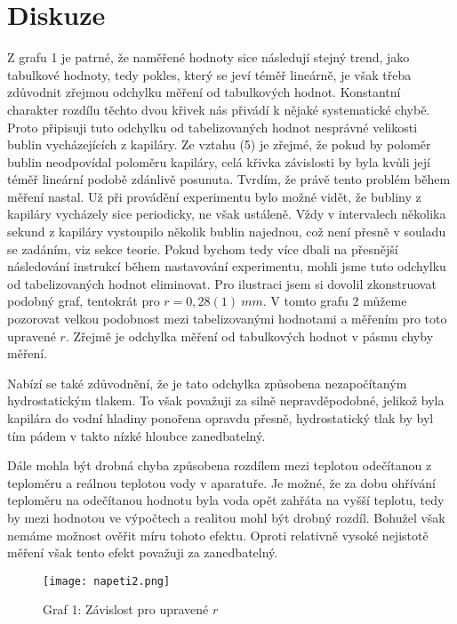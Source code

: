 \documentclass{prepareprotokol} %
\begin{document}
\section{Diskuze}

Z grafu 1 je patrné, že naměřené hodnoty sice následují stejný trend, jako tabulkové hodnoty, tedy pokles, který se jeví téměř lineárně, je však třeba zdůvodnit zřejmou odchylku měření od tabulkových hodnot. Konstantní charakter rozdílu těchto dvou křivek nás přivádí k nějaké systematické chybě. Proto připisuji tuto odchylku od tabelizovaných hodnot nesprávné velikosti bublin vycházejících z kapiláry. Ze vztahu (5) je zřejmé, že pokud by poloměr bublin neodpovídal poloměru kapiláry, celá křivka závislosti by byla kvůli její téměř lineární podobě zdánlivě posunuta. Tvrdím, že právě tento problém během měření nastal. Už při provádění experimentu bylo možné vidět, že bubliny z kapiláry vycházely sice periodicky, ne však ustáleně. Vždy v intervalech několika sekund z kapiláry vystoupilo několik bublin najednou, což není přesně v souladu se zadáním, viz sekce teorie. Pokud bychom tedy více dbali na přesnější následování instrukcí během nastavování experimentu, mohli jsme tuto odchylku od tabelizovaných hodnot eliminovat. Pro ilustraci jsem si dovolil zkonstruovat podobný graf, tentokrát pro $r=0,28(1) \:mm$. V tomto grafu 2 můžeme pozorovat velkou podobnost mezi tabelizovanými hodnotami a měřením pro toto upravené $r$. Zřejmě je odchylka měření od tabulkových hodnot v pásmu chyby měření. 

Nabízí se také zdůvodnění, že je tato odchylka způsobena nezapočítaným hydrostatickým tlakem. To však považuji za silně nepravděpodobné, jelikož byla kapilára do vodní hladiny ponořena opravdu přesně, hydrostatický tlak by byl tím pádem v takto nízké hloubce zanedbatelný. 

Dále mohla být drobná chyba způsobena rozdílem mezi teplotou odečítanou z teploměru a reálnou teplotou vody v aparatuře. Je možné, že za dobu ohřívání teploměru na odečítanou hodnotu byla voda opět zahřáta na vyšší teplotu, tedy by mezi hodnotou ve výpočtech a realitou mohl být drobný rozdíl. Bohužel však nemáme možnost ověřit míru tohoto efektu. Oproti relativně vysoké nejistotě měření však tento efekt považuji za zanedbatelný. 

\begin{figure}[h!]
    \centering
    \texttt{[image: napeti2.png]}
    \caption{Graf 1: Závislost pro upravené $r$}
    \label{fig:napeti}
\end{figure}
\end{document}
